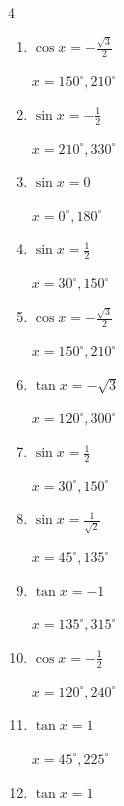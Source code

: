 \begin{multicols}{4}
\begin{enumerate}
  \itemsep=1pt
  \item $\displaystyle \cos{x}  = -\frac{\sqrt{3}}{2}$

        $\displaystyle x = 150^{\circ} , 210^{\circ}$

  \item $\displaystyle \sin{x}  = -\frac{1}{2}$

        $\displaystyle x = 210^{\circ} , 330^{\circ}$

  \item $\displaystyle \sin{x}  = 0$

        $\displaystyle x = 0^{\circ} , 180^{\circ}$

  \item $\displaystyle \sin{x}  = \frac{1}{2}$

        $\displaystyle x = 30^{\circ} , 150^{\circ}$

  \item $\displaystyle \cos{x}  = -\frac{\sqrt{3}}{2}$

        $\displaystyle x = 150^{\circ} , 210^{\circ}$

  \item $\displaystyle \tan{x}  = -\sqrt{3}$

        $\displaystyle x = 120^{\circ} , 300^{\circ}$

  \item $\displaystyle \sin{x}  = \frac{1}{2}$

        $\displaystyle x = 30^{\circ} , 150^{\circ}$

  \item $\displaystyle \sin{x}  = \frac{1}{\sqrt{2}}$

        $\displaystyle x = 45^{\circ} , 135^{\circ}$

  \item $\displaystyle \tan{x}  = -1$

        $\displaystyle x = 135^{\circ} , 315^{\circ}$

  \item $\displaystyle \cos{x}  = -\frac{1}{2}$

        $\displaystyle x = 120^{\circ} , 240^{\circ}$

  \item $\displaystyle \tan{x}  = 1$

        $\displaystyle x = 45^{\circ} , 225^{\circ}$

  \item $\displaystyle \tan{x}  = 1$


\end{enumerate}
\end{multicols}
